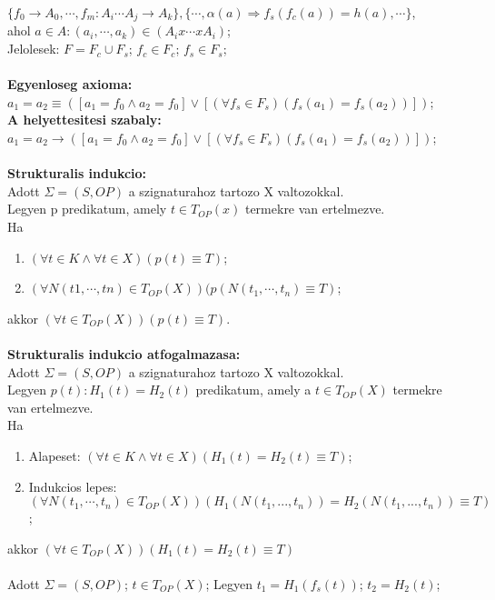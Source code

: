 \documentclass[a4paper,10pt]{article}
\begin{document}
$\lbrace f_0 \to A_0, \cdots, f_m:A_i \cdots A_j \to A_k\rbrace, \lbrace\cdots, \alpha(a) \Rightarrow f_s(f_c(a))=h(a), \cdots\rbrace$,\\
ahol $a \in A:(a_i, \cdots, a_k) \in (A_i x \cdots x A_i)$;\\
Jelolesek: $F = F_c \cup F_s$; $f_c \in F_c$; $f_s \in F_s$;\\ \\
\textbf{Egyenloseg axioma:}\\
$a_1=a_2 \equiv ([a_1 = f_0 \wedge a_2 = f_0] \vee [(\forall f_s \in F_s)(f_s(a_1)=f_s(a_2))])$;\\
\textbf{A helyettesitesi szabaly:}\\
$a_1 = a_2 \to ([a_1 = f_0 \wedge a_2 = f_0] \vee [(\forall f_s\in F_s)(f_s(a_1)=f_s(a_2))])$;\\ \\
\textbf{Strukturalis indukcio:}\\ Adott $\Sigma=(S,OP)$ a szignaturahoz tartozo X valtozokkal.\\
Legyen p predikatum, amely $t\in T_{OP}(x)$ termekre van ertelmezve.\\
Ha
\begin{enumerate}
\item $(\forall t \in K \wedge \forall t \in X)(p(t)\equiv T)$;
\item $(\forall N(t1, \cdots, tn) \in T_{OP}(X))(p(N(t_1, \cdots, t_n) \equiv T)$;
\end{enumerate}
akkor $(\forall t \in T_{OP}(X))(p(t)\equiv T)$.\\ \\
\textbf{Strukturalis indukcio atfogalmazasa:}\\ Adott $\Sigma=(S, OP)$ a szignaturahoz tartozo X valtozokkal.\\
Legyen $p(t): H_1(t) = H_2(t)$ predikatum, amely a $t \in T_{OP}(X)$ termekre van ertelmezve.\\
Ha
\begin{enumerate}
\item Alapeset: $(\forall t \in K \wedge \forall t \in X)(H_1(t)=H_2(t) \equiv T)$;
\item Indukcios lepes: $(\forall N(t_1, \cdots, t_n)\in T_{OP}(X))(H_1(N(t_1, ..., t_n)) = H_2(N(t_1, ..., t_n)) \equiv T)$;
\end{enumerate} 
akkor $(\forall t\in T_{OP}(X))(H_1(t)=H_2(t) \equiv T)$\\ \\
Adott $\Sigma=(S, OP)$; $t \in T_{OP}(X)$; Legyen $t_1 = H_1(f_s(t))$; $t_2=H_2(t)$;\\
\end{document}
